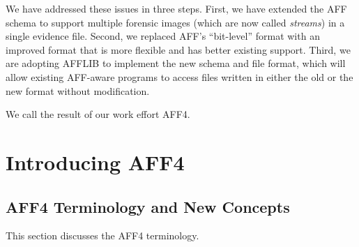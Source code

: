 \documentclass[10pt, conference]{IEEEtran}
\begin{document}
We have addressed these issues in three steps. First, we have extended
the AFF schema to support multiple forensic images (which are now
called \emph{streams}) in a single evidence file. Second, we replaced
AFF's ``bit-level'' format with an improved format that is more
flexible and has better existing support. Third, we are adopting
AFFLIB to implement the new schema and file format, which will allow
existing AFF-aware programs to access files written in either the old
or the new format without modification.

We call the result of our work effort AFF4.

\section{Introducing AFF4}


\subsection{AFF4 Terminology and New Concepts}

This section discusses the AFF4 terminology. 
\end{document}
